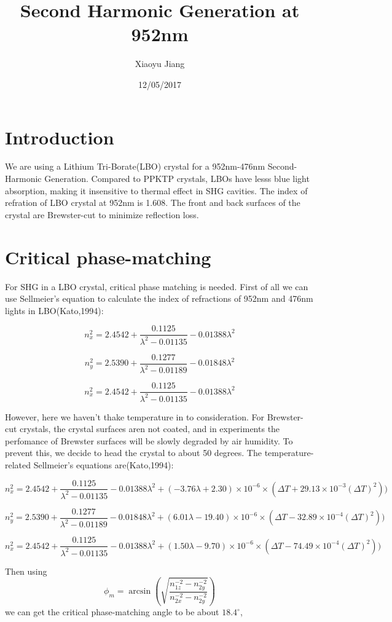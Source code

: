 \documentclass{article}
\title{Second Harmonic Generation at 952nm}
\author{Xiaoyu Jiang}
\date{12/05/2017}
\begin{document}
\maketitle
\section{Introduction}
We are using a Lithium Tri-Borate(LBO) crystal for a 952nm-476nm Second-Harmonic Generation. Compared to PPKTP crystals, LBOs have lesss blue light absorption, making it insensitive to thermal effect in SHG cavities. The index of refration of LBO crystal at 952nm is 1.608. The front and back surfaces of the crystal are Brewster-cut to minimize reflection loss.
\section{Critical phase-matching}
For SHG in a LBO crystal, critical phase matching is needed. First of all we can use Sellmeier's equation to calculate the index of refractions of 952nm and 476nm lights in LBO(Kato,1994):

$$n_x^2=2.4542+\frac{0.1125}{\lambda^2-0.01135}-0.01388\lambda^2$$

$$n_y^2=2.5390+\frac{0.1277}{\lambda^2-0.01189}-0.01848\lambda^2$$

$$n_x^2=2.4542+\frac{0.1125}{\lambda^2-0.01135}-0.01388\lambda^2$$

However, here we haven't thake temperature in to consideration. For Brewster-cut crystals, the crystal surfaces aren not coated, and in experiments the perfomance of Brewster surfaces will be slowly degraded by air humidity. To prevent this, we decide to head the crystal to about 50 degrees. The temperature-related Sellmeier's equations are(Kato,1994):

$$n_x^2=2.4542+\frac{0.1125}{\lambda^2-0.01135}-0.01388\lambda^2+(-3.76\lambda+2.30)\times10^{-6}\times({\Delta}T+29.13\times10^{-3}({\Delta}T)^2))$$

$$n_y^2=2.5390+\frac{0.1277}{\lambda^2-0.01189}-0.01848\lambda^2+(6.01\lambda-19.40)\times10^{-6}\times({\Delta}T-32.89\times10^{-4}({\Delta}T)^2))$$

$$n_x^2=2.4542+\frac{0.1125}{\lambda^2-0.01135}-0.01388\lambda^2+(1.50\lambda-9.70)\times10^{-6}\times({\Delta}T-74.49\times10^{-4}({\Delta}T)^2))$$

Then using
$${\phi}_m=\arcsin{(\sqrt{\frac{n_{1z}^{-2}-n_{2y}^{-2}}{n_{2x}^{-2}-n_{2y}^{-2}}})}$$
we can get the critical phase-matching angle to be about $18.4^{\circ}$,
\end{document}
